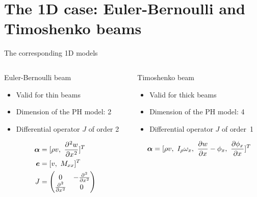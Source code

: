 \documentclass{beamer}
\begin{document}
\section{The 1D case: Euler-Bernoulli and Timoshenko beams}

\begin{frame}{The corresponding 1D models}
\begin{columns}
	\begin{column}[t]{0.45\textwidth}
		\begin{block}{Euler-Bernoulli beam}
			\begin{itemize}
				\item Valid for thin beams \\
				\item Dimension of the PH model: 2 \\
				\item Differential operator $J$ of order 2 \\
			\end{itemize}
		\end{block}
	\begin{equation*}
	\begin{aligned}
	\bm{\alpha} &= [\rho v, \ \diffp[2]{w}{x}]^T \\
	\bm{e} &= [v, \ M_{xx}]^T \\
	J &= 
	\begin{pmatrix}
	0 &  -\diffp[2]{}{x} \\
	\diffp[2]{}{x} & 0  \\
	\end{pmatrix}
	\end{aligned}
	\end{equation*}
	\end{column}
	\begin{column}[t]{0.5\textwidth}
		\begin{block}{Timoshenko beam}
			\begin{itemize}
				\item Valid for thick beams \\
				\item Dimension of the PH model: 4 \\
				\item Differential operator $J$ of order~1 \\
			\end{itemize}
		\end{block}
	\begin{equation*}
	\begin{aligned}
	\bm{\alpha} &= [\rho v, \ I_{\rho} \omega_x, \ \diffp{w}{x} - \phi_x, \ \diffp{\phi_x}{x}]^T \\

\end{aligned}
\end{equation*}
\end{column}
\end{columns}
\end{frame}
\end{document}
